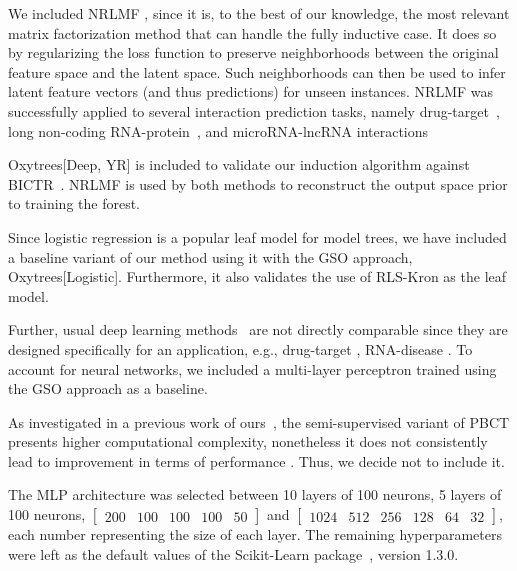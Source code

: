\documentclass[sn-mathphys-num]{sn-jnl}%
\theoremstyle{thmstyleone}%
\theoremstyle{thmstyletwo}%
\theoremstyle{thmstylethree}%
\begin{document}
\begin{appendices}
We included NRLMF \cite{liu_neighborhood_2016,liu_lpi-nrlmf_2017,liu_predicting_2020}, since it is, to the best of our knowledge, the most relevant matrix factorization method that can handle the fully inductive case.
It does so by regularizing the loss function to preserve neighborhoods between the original feature space and the latent space. Such neighborhoods can then be used to infer latent feature vectors (and thus predictions) for unseen instances.
NRLMF was successfully applied to several interaction prediction tasks, namely drug-target~\cite{liu_neighborhood_2016}, long non-coding RNA-protein~\cite{liu_lpi-nrlmf_2017}, and microRNA-lncRNA interactions~\cite{liu_predicting_2020}

Oxytrees[Deep, YR] is included to validate our induction algorithm against BICTR~\cite{pliakos_drug-target_2020}. NRLMF is used by both methods to reconstruct the output space prior to training the forest.

Since logistic regression is a popular leaf model for model trees, we have included a baseline variant of our method using it with the GSO approach, Oxytrees[Logistic]. Furthermore, it also validates the use of RLS-Kron as the leaf model.   

Further, usual deep learning methods~\cite{huang_moltrans_2020,dehghan_tripletmultidti_2023} are not directly comparable since they are designed specifically for an application, e.g., drug-target \cite{liu2024ssldti}, RNA-disease \cite{tian2024mgcnss}. To account for neural networks, we included a multi-layer perceptron trained using the GSO approach as a baseline. 

As investigated in a previous work of ours~\cite{ilidio_fast_2024}, the semi-supervised variant of PBCT presents higher computational complexity, nonetheless it does not consistently lead to improvement in terms of performance \cite{ilidio_fast_2024}. Thus, we decide not to include it.       

The MLP architecture was selected between 10 layers of 100 neurons, 5 layers of 100 neurons, $\begin{bmatrix} 200 & 100 & 100 & 100 & 50 \end{bmatrix}$ and $\begin{bmatrix} 1024 & 512 & 256 & 128 & 64 & 32 \end{bmatrix}$, each number representing the size of each layer. The remaining hyperparameters were left as the default values of the Scikit-Learn package~\cite{pedregosa_scikit-learn_2011}, version 1.3.0.


\end{appendices}
\end{document}
